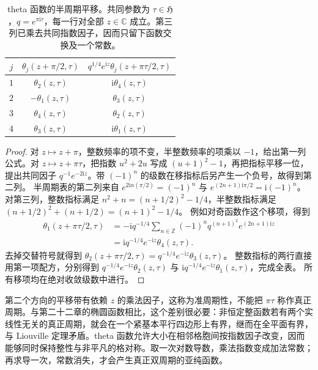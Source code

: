 \begin{table}[htbp]
\centering
\caption[theta 函数的半周期平移]{theta 函数的半周期平移。共同参数为
\(\tau\in\mathfrak H\)，\(q=e^{\pi\mathrm i\tau}\)，每一行对全部 \(z\in\mathbb C\) 成立。第三列已乘去共同指数因子，因而只留下函数交换及一个常数。}
\label{b3:tab:24-half-translations}
\begin{tabular}{ccc}
\toprule
 \(j\) & \(\theta_j(z+\pi/2,\tau)\) &
 \(q^{1/4}e^{\mathrm iz}\theta_j(z+\pi\tau/2,\tau)\)\\
\midrule
 \(1\) & \(\theta_2(z,\tau)\) & \(\mathrm i\theta_4(z,\tau)\)\\
 \(2\) & \(-\theta_1(z,\tau)\) & \(\theta_3(z,\tau)\)\\
 \(3\) & \(\theta_4(z,\tau)\) & \(\theta_2(z,\tau)\)\\
 \(4\) & \(\theta_3(z,\tau)\) & \(\mathrm i\theta_1(z,\tau)\)\\
\bottomrule
\end{tabular}
\end{table}
\begin{proof}
对 \(z\mapsto z+\pi\)，整数频率的项不变，半整数频率的项乘以 \(-1\)，给出第一列公式。对 \(z\mapsto z+\pi\tau\)，把指数
\(u^2+2u\) 写成 \((u+1)^2-1\)，再把指标平移一位，提出共同因子 \(q^{-1}e^{-2\mathrm iz}\)。带 \((-1)^n\) 的级数在移指标后另产生一个负号，故得到第二列。
半周期表的第二列来自
\(e^{2\mathrm in(\pi/2)}=(-1)^n\) 与
\(e^{(2n+1)\mathrm i\pi/2}=\mathrm i(-1)^n\)。
对第三列，整数指标满足
\(n^2+n=(n+1/2)^2-1/4\)，半整数指标满足
\((n+1/2)^2+(n+1/2)=(n+1)^2-1/4\)。
例如对奇函数作这个移项，得到
\[
\begin{aligned}
 \theta_1(z+\pi\tau/2,\tau)
 &=-\mathrm i q^{-1/4}
       \sum_{n\in\mathbb Z}(-1)^nq^{(n+1)^2}e^{(2n+1)\mathrm iz}\\
 &=\mathrm i q^{-1/4}e^{-\mathrm iz}\theta_4(z,\tau).
\end{aligned}
\]
去掉交替符号就得到
\(\theta_2(z+\pi\tau/2,\tau)=q^{-1/4}e^{-\mathrm iz}\theta_3(z,\tau)\)。
整数指标的两行直接用第一项配方，分别得到
\(q^{-1/4}e^{-\mathrm iz}\theta_2(z,\tau)\) 与
\(\mathrm i q^{-1/4}e^{-\mathrm iz}\theta_1(z,\tau)\)，完成全表。
所有移项均在绝对收敛级数中进行。
\end{proof}

第二个方向的平移带有依赖 \(z\) 的乘法因子，这称为准周期性，不能把 \(\pi\tau\) 称作真正周期。与第二十二章的椭圆函数相比，这个差别很必要：非恒定整函数若有两个实线性无关的真正周期，就会在一个紧基本平行四边形上有界，继而在全平面有界，与 Liouville 定理矛盾。theta 函数允许大小在相邻格胞间按指数因子改变，因而能够同时保持整性与非平凡的格对称。取一次对数导数，乘法指数变成加法常数；再求导一次，常数消失，才会产生真正双周期的亚纯函数。

